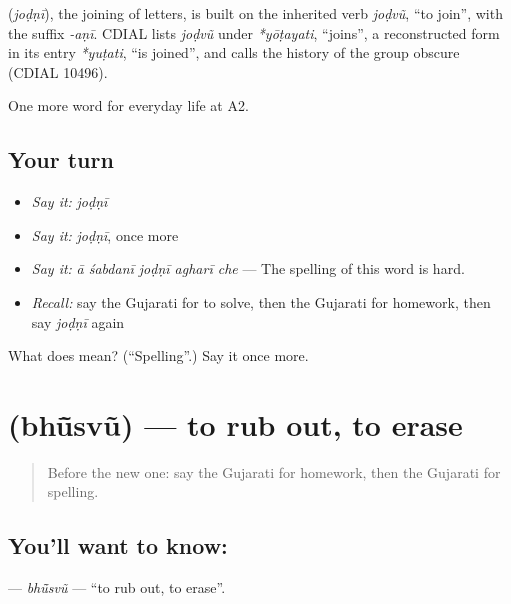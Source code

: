 \begin{cousinweb}
\textbf{} (\emph{joḍṇī}), the joining of letters, is built on the inherited verb \emph{joḍvũ}, \textquotedblleft{}to join\textquotedblright{}, with the suffix \emph{-aṇī}. CDIAL lists \emph{joḍvũ} under \emph{*yōṭayati}, \textquotedblleft{}joins\textquotedblright{}, a reconstructed form in its entry \emph{*yuṭati}, \textquotedblleft{}is joined\textquotedblright{}, and calls the history of the group obscure (CDIAL 10496).
\end{cousinweb}

\begin{grammarlens}[title={What you've built}]
One more word for everyday life at A2.
\end{grammarlens}

\subsection*{Your turn}
\begin{itemize}
\raggedright
  \item \emph{Say it:} \emph{joḍṇī}
  \item \emph{Say it:} \emph{joḍṇī}, once more
  \item \emph{Say it:} \emph{ā śabdanī joḍṇī agharī che} — The spelling of this word is hard.
  \item \emph{Recall:} say the Gujarati for to solve, then the Gujarati for homework, then say \emph{joḍṇī} again
\end{itemize}

\begin{tcolorbox}[breakable,colback=teal!4,colframe=teal!35!black,title={Before you move on}]
What does  mean? (\textquotedblleft{}Spelling\textquotedblright{}.) Say it once more.
\end{tcolorbox}
\section[\texorpdfstring{\gu{ભૂંસવું} (bhū̃svũ)}{ભૂંસવું (bhū̃svũ)}]{ (bhū̃svũ) — to rub out, to erase}

\label{lesson:GU-C245-bhusvu}



\begin{quote}
Before the new one: say the Gujarati for homework, then the Gujarati for spelling.
\end{quote}

\subsection*{You'll want to know: }
\textbf{} — \emph{bhū̃svũ} — \textquotedblleft{}to rub out, to erase\textquotedblright{}.

